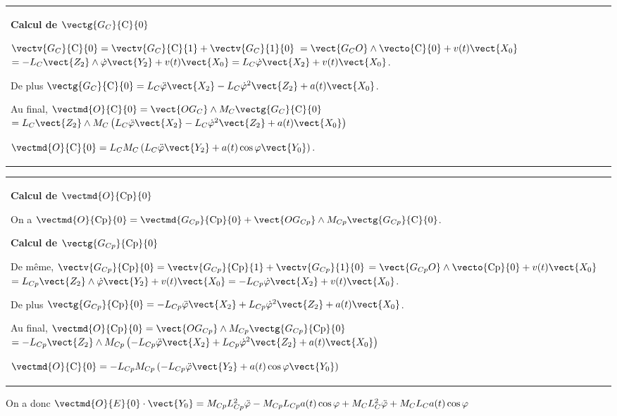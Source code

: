 \begin{multicols}{2}
\begin{corrige}
\begin{tabular}{|p{.9\linewidth}}
\textbf{Calcul de $\vectg{G_{C}}{\text{C}}{0}$}

$\vectv{G_C}{\text{C}}{0}=\vectv{G_C}{\text{C}}{1}+\vectv{G_C}{\text{1}}{0}$ $=\vect{G_CO}\wedge \vecto{\text{C}}{0}+v(t)\vect{X_0}$ $=-L_C\vect{Z_2}\wedge \dot{\varphi}\vect{Y_2}+v(t)\vect{X_0}=L_C \dot{\varphi}\vect{X_2}+v(t)\vect{X_0}$.

De plus  $\vectg{G_C}{\text{C}}{0}=L_C \ddot{\varphi}\vect{X_2}-L_C \dot{\varphi}^2\vect{Z_2}+a(t)\vect{X_0}$.

Au final, $\vectmd{O}{\text{C}}{0} = \vect{OG_C} \wedge M_C\vectg{G_{C}}{\text{C}}{0}$
$ =L_C\vect{Z_2} \wedge M_C \left( L_C \ddot{\varphi}\vect{X_2}-L_C \dot{\varphi}^2\vect{Z_2}+a(t)\vect{X_0} \right)$

$\vectmd{O}{\text{C}}{0} =L_C M_C \left( L_C \ddot{\varphi}\vect{Y_2} +a(t) \cos \varphi \vect{Y_0} \right)$.

\end{tabular}

\vspace{.25cm}

 \begin{tabular}{|p{.9\linewidth}}
\textbf{Calcul de $\vectmd{O}{\text{Cp}}{0}$}

 On a $\vectmd{O}{\text{Cp}}{0} = \vectmd{G_{Cp}}{\text{Cp}}{0}+\vect{OG_{Cp}} \wedge M_{Cp}\vectg{G_{Cp}}{\text{C}}{0}$.

\textbf{Calcul de $\vectg{G_{Cp}}{\text{Cp}}{0}$}

De même, $\vectv{G_{Cp}}{\text{Cp}}{0}=\vectv{G_{Cp}}{\text{Cp}}{1}+\vectv{G_{Cp}}{\text{1}}{0}$ $=\vect{G_{Cp}O}\wedge \vecto{\text{Cp}}{0}+v(t)\vect{X_0}$ $=L_{Cp}\vect{Z_2}\wedge \dot{\varphi}\vect{Y_2}+v(t)\vect{X_0}=-L_{Cp} \dot{\varphi}\vect{X_2}+v(t)\vect{X_0}$. 

De plus  $\vectg{G_{Cp}}{\text{Cp}}{0}=-L_{Cp} \ddot{\varphi}\vect{X_2}+L_{Cp} \dot{\varphi}^2\vect{Z_2}+a(t)\vect{X_0}$. 

Au final, $\vectmd{O}{\text{Cp}}{0} = \vect{OG_{Cp}} \wedge M_{Cp}\vectg{G_{Cp}}{\text{Cp}}{0}$
$ =-L_{Cp}\vect{Z_2} \wedge M_{Cp} \left( -L_{Cp} \ddot{\varphi}\vect{X_2}+L_{Cp} \dot{\varphi}^2\vect{Z_2}+a(t)\vect{X_0}\right)$

$\vectmd{O}{\text{C}}{0} =-L_{Cp} M_{Cp} \left( -L_{Cp} \ddot{\varphi}\vect{Y_2} +a(t)\cos\varphi\vect{Y_0} \right)$
\\
\end{tabular}

On a donc $\vectmd{O}{E}{0}\cdot \vect{Y_0} =M_{Cp} L_{Cp}^2 \ddot{\varphi} -M_{Cp}L_{Cp}a(t)\cos\varphi +  M_CL_C^2 \ddot{\varphi} +M_CL_Ca(t) \cos \varphi $


\end{corrige}
\end{multicols}
